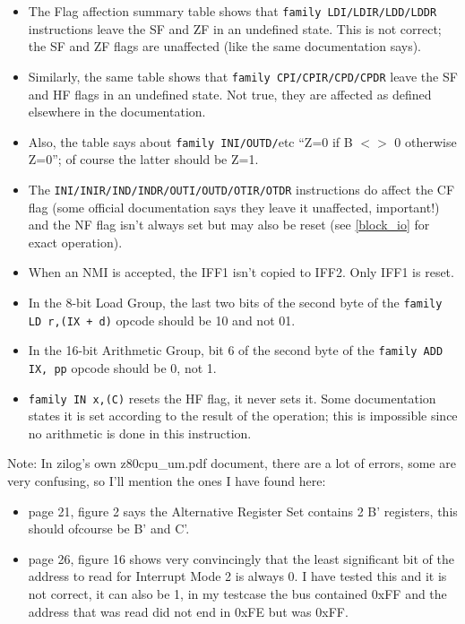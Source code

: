 \documentclass[twoside,openright,a4paper]{book}
\begin{document}
\begin{itemize}

	\item
	The Flag affection summary table shows that {\tt family LDI/LDIR/LDD/LDDR} instructions leave the SF and ZF in an undefined state. This is not correct; the SF and ZF flags are unaffected (like the same documentation says).

	\item
	Similarly, the same table shows that {\tt family CPI/CPIR/CPD/CPDR} leave the SF and HF flags in an undefined state. Not true, they are affected as defined elsewhere in the documentation.

	\item
	Also, the table says about {\tt family INI/OUTD/}etc ``Z=0 if B $<>$ 0 otherwise Z=0''; of course the latter should be Z=1.

	\item
	The {\tt INI/INIR/IND/INDR/OUTI/OUTD/OTIR/OTDR} instructions do affect the CF flag (some official documentation says they leave it unaffected, important!) and the NF flag isn't always set but may also be reset (see \ref{block_io} for exact operation).

	\item
	When an NMI is accepted, the IFF1 isn't copied to IFF2. Only IFF1 is reset.

	\item
	In the 8-bit Load Group, the last two bits of the second byte of the {\tt family LD r,(IX + d)} opcode should be 10 and not 01.

	\item
	In the 16-bit Arithmetic Group, bit 6 of the second byte of the {\tt family ADD IX, pp} opcode should be 0, not 1.

	\item
	{\tt family IN x,(C)} resets the HF flag, it never sets it. Some documentation states it is set according to the result of the operation; this is impossible since no arithmetic is done in this instruction.

\end{itemize}

Note: In zilog's own z80cpu\_um.pdf document, there are a lot of errors, some are very confusing, so I'll mention the ones I have found here:

\begin{itemize}

	\item
	page 21, figure 2 says the Alternative Register Set contains 2 B' registers, this should ofcourse be B' and C'.  

	\item
	page 26, figure 16 shows very convincingly that the least significant bit of the address to read for Interrupt Mode 2 is always 0. I have tested this and it is not correct, it can also be 1, in my testcase the bus contained 0xFF and the address that was read did not end in 0xFE but was 0xFF.
  
\end{itemize}
\end{document}
